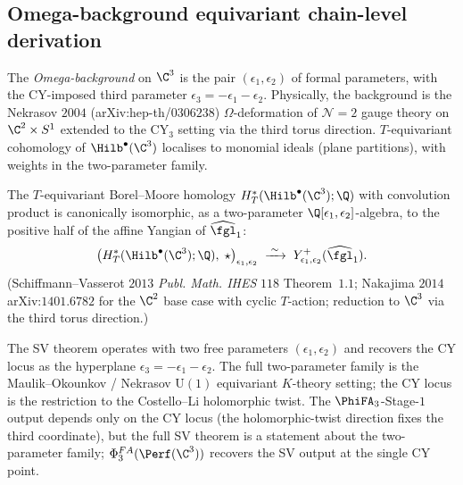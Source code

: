 \subsection*{Omega-background equivariant chain-level derivation}

\begin{definition}
\label{def:omega-background-wave10}
\ClaimStatusDefinitional
The \emph{Omega-background} on $\C^3$ is the pair $(\epsilon_1, \epsilon_2)$
of formal parameters, with the CY-imposed third parameter
$\epsilon_3 = -\epsilon_1 - \epsilon_2$. Physically, the background is
the Nekrasov $2004$ (arXiv:hep-th/$0306238$) $\Omega$-deformation of
$\mathcal N = 2$ gauge theory on $\C^2 \times S^1$ extended to the
CY$_3$ setting via the third torus direction.
$T$-equivariant cohomology of $\Hilb^\bullet(\C^3)$ localises to monomial
ideals (plane partitions), with weights in the two-parameter family.
\end{definition}

\begin{theorem}[Equivariant chain-level CoHA $=$ SV positive half]
\label{thm:equivariant-chain-coha-wave10}
\ClaimStatusProvedElsewhere
The $T$-equivariant Borel--Moore homology $H^*_T(\Hilb^\bullet(\C^3); \Q)$
with convolution product is canonically isomorphic, as a two-parameter
$\Q[\epsilon_1, \epsilon_2]$-algebra, to the positive half of the
affine Yangian of $\widehat{\fgl}_1$:
\[
 \bigl(H^*_T(\Hilb^\bullet(\C^3); \Q),\; \star\bigr)_{\epsilon_1, \epsilon_2}
 \;\xrightarrow{\;\sim\;}\; Y^+_{\epsilon_1, \epsilon_2}(\widehat{\fgl}_1).
\]
(Schiffmann--Vasserot $2013$ \textit{Publ. Math. IHES} $118$
Theorem~$1.1$; Nakajima $2014$ arXiv:$1401.6782$ for the $\C^2$ base
case with cyclic $T$-action; reduction to $\C^3$ via the third torus
direction.)
\end{theorem}

\begin{remark}
\label{rem:two-parameter-vs-cy-wave10}
The SV theorem operates with two free parameters $(\epsilon_1,
\epsilon_2)$ and recovers the CY locus as the hyperplane
$\epsilon_3 = -\epsilon_1 - \epsilon_2$. The full two-parameter family
is the Maulik--Okounkov / Nekrasov $\mathrm{U}(1)$ equivariant
$K$-theory setting; the CY locus is the restriction to the
Costello--Li holomorphic twist. The $\PhiFA_3$-Stage-$1$ output
depends only on the CY locus (the holomorphic-twist direction fixes
the third coordinate), but the full SV theorem is a statement about
the two-parameter family; $\Phi^{FA}_3(\Perf(\C^3))$ recovers the SV
output at the single CY point.
\end{remark}

